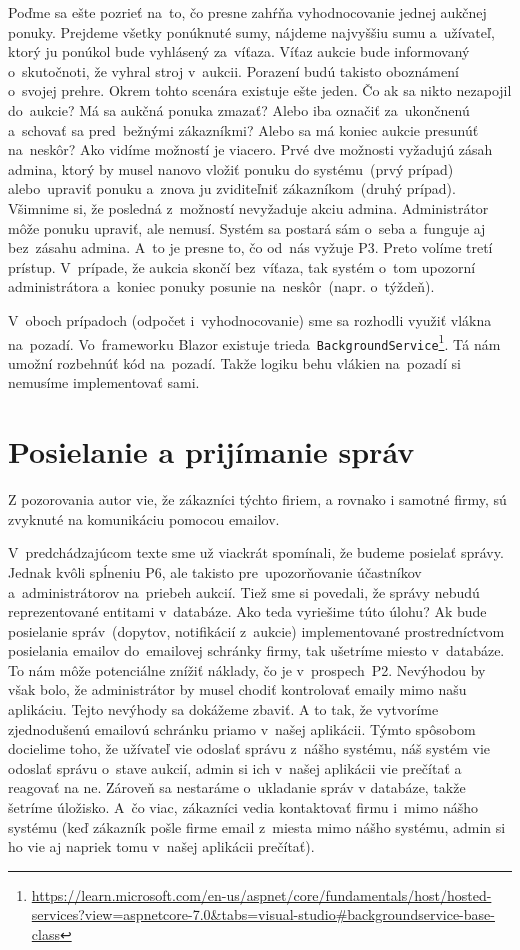 Poďme sa ešte pozrieť na~to, čo presne zahŕňa vyhodnocovanie jednej aukčnej ponuky. Prejdeme všetky ponúknuté sumy, nájdeme najvyššiu sumu a~užívateľ, ktorý ju ponúkol bude vyhlásený za~víťaza. Víťaz aukcie bude informovaný o~skutočnoti, že vyhral stroj v~aukcii. Porazení budú takisto oboznámení o~svojej prehre. Okrem tohto scenára existuje ešte jeden. Čo ak sa nikto nezapojil do~aukcie? Má sa aukčná ponuka zmazať? Alebo iba označiť za~ukončnenú a~schovať sa pred~bežnými zákazníkmi? Alebo sa má koniec aukcie presunúť na~neskôr? Ako vidíme možností je viacero. Prvé dve možnosti vyžadujú zásah admina, ktorý by musel nanovo vložiť ponuku do systému~(prvý prípad) alebo~upraviť ponuku a~znova ju zviditeľniť zákazníkom~(druhý prípad). Všimnime si, že posledná z~možností nevyžaduje akciu admina. Administrátor môže ponuku upraviť, ale nemusí. Systém sa postará sám o~seba a~funguje aj bez~zásahu admina. A~to je presne to, čo od~nás vyžuje P3. Preto volíme tretí prístup. V~prípade, že aukcia skončí bez~víťaza, tak systém o~tom upozorní administrátora a~koniec ponuky posunie na~neskôr~(napr. o~týždeň).

V~oboch prípadoch (odpočet i~vyhodnocovanie) sme sa rozhodli využiť vlákna na~pozadí. Vo~frameworku Blazor existuje trieda~\verb|BackgroundService|\footnote{\url{https://learn.microsoft.com/en-us/aspnet/core/fundamentals/host/hosted-services?view=aspnetcore-7.0&tabs=visual-studio\#backgroundservice-base-class}}. Tá nám umožní rozbehnúť kód na~pozadí. Takže logiku behu vlákien na~pozadí si nemusíme implementovať sami.

\section{Posielanie a prijímanie správ}

Z pozorovania autor vie, že zákazníci týchto firiem, a rovnako i samotné firmy, sú zvyknuté na komunikáciu pomocou emailov.

V~predchádzajúcom texte sme už viackrát spomínali, že budeme posielať správy. Jednak kvôli spĺneniu P6, ale takisto pre~upozorňovanie účastníkov a~administrátorov na~priebeh aukcií. Tiež sme si povedali, že správy nebudú reprezentované entitami v~databáze. Ako teda vyriešime túto úlohu? Ak bude posielanie správ~(dopytov, notifikácií z~aukcie) implementované prostredníctvom posielania emailov do~emailovej schránky firmy, tak ušetríme miesto v~databáze. To nám môže potenciálne znížiť náklady, čo je v~prospech~P2. Nevýhodou by však bolo, že administrátor by musel chodiť kontrolovať emaily mimo našu aplikáciu. Tejto nevýhody sa dokážeme zbaviť. A to tak, že vytvoríme zjednodušenú emailovú schránku priamo v~našej aplikácii. Týmto spôsobom docielime toho, že užívateľ vie odoslať správu z~nášho systému, náš systém vie odoslať správu o~stave aukcií, admin si ich v~našej aplikácii vie prečítať a reagovať na ne. Zároveň sa nestaráme o~ukladanie správ v databáze, takže šetríme úložisko. A~čo viac, zákazníci vedia kontaktovať firmu i~mimo nášho systému (keď zákazník pošle firme email z~miesta mimo nášho systému, admin si ho vie aj napriek tomu v~našej aplikácii prečítať).

